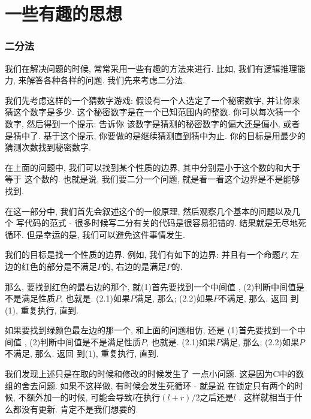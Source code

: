 \part{一些有趣的思想}

\section{二分法}

我们在解决问题的时候, 常常采用一些有趣的方法来进行. 比如, 我们有逻辑推理能力, 
来解答各种各样的问题. 我们先来考虑二分法. 

我们先考虑这样的一个猜数字游戏: 假设有一个人选定了一个秘密数字, 并让你来猜这个数字是多少.
这个秘密数字是在一个已知范围内的整数. 你可以每次猜一个数字, 然后得到一个提示: 告诉你
该数字是猜测的秘密数字的偏大还是偏小, 或者是猜中了. 
基于这个提示, 你要做的是继续猜测直到猜中为止. 你的目标是用最少的猜测次数找到秘密数字. 

在上面的问题中, 我们可以找到某个性质的边界, 其中分别是小于这个数的和大于等于
这个数的. 也就是说, 我们要二分一个问题, 就是看一看这个边界是不是能够找到. 

在这一部分中, 我们首先会叙述这个的一般原理, 然后观察几个基本的问题以及几个
写代码的范式 - 很多时候写二分有关的代码是很容易犯错的. 结果就是无尽地死循环.
但是幸运的是, 我们可以避免这件事情发生. 


 我们的目标是找一个性质的边界. 例如, 我们有如下的边界: 
并且有一个命题$P$, 左边的红色的部分是不满足$P$的, 右边的是满足$P$的. 


那么, 要找到红色的最右边的那个, 就(1)首先要找到一个中间值
, (2)判断中间值是不是满足性质$P$, 也就是. (2.1)如果$P$满足, 
那么; (2.2)如果$P$不满足, 那么. 返回
到(1), 重复执行, 直到. 

如果要找到绿颜色最左边的那一个, 和上面的问题相仿, 还是
(1)首先要找到一个中间值
, (2)判断中间值是不是满足性质$P$, 也就是. (2.1)如果$P$满足, 
那么; (2.2)如果$P$不满足, 那么. 返回
到(1), 重复执行, 直到. 

我们发现上述只是在取的时候和修改的时候发生了
一点小问题. 这是因为C中的数组的舍去问题. 如果不这样做, 有时候会发生死循环 - 就是说
在锁定只有两个的时候, 不额外加一的时候, 可能会导致$l$在执行$(l+r)/2$之后还是$l$
. 这样就相当于什么都没有更新. 肯定不是我们想要的. 


